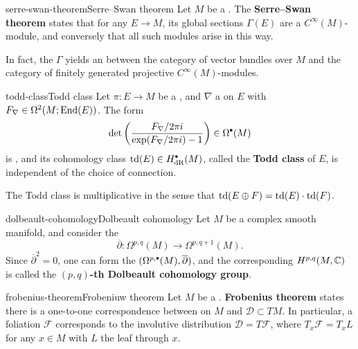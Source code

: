 \begin{topic}{serre-swan-theorem}{Serre--Swan theorem}
    Let $M$ be a  . The \textbf{Serre--Swan theorem} states that for any  $E \to M$, its global sections $\Gamma(E)$ are a   $C^\infty(M)$-module, and conversely that all such modules arise in this way.
    
    In fact, the  $\Gamma$ yields an  between the category of vector bundles over $M$ and the category of finitely generated projective $C^\infty(M)$-modules.
\end{topic}

\begin{topic}{todd-class}{Todd class}
    Let $\pi : E \to M$ be a , and $\nabla$ a  on $E$ with  $F_\nabla \in \Omega^2(M; \textup{End}(E))$. The form
    \[ \det\left(\frac{F_\nabla / 2 \pi i}{\exp(F_\nabla / 2 \pi i) - 1}\right) \in \Omega^\bdot(M) \]
    is , and its cohomology class $\textup{td}(E) \in H^\bdot_\textup{dR}(M)$, called the \textbf{Todd class} of $E$, is independent of the choice of connection.
    
    The Todd class is multiplicative in the sense that $\textup{td}(E \oplus F) = \textup{td}(E) \cdot \textup{td}(F)$.
\end{topic}

\begin{topic}{dolbeault-cohomology}{Dolbeault cohomology}
    Let $M$ be a complex smooth manifold, and consider the 
    \[ \overline{\partial} : \Omega^{p, q}(M) \to \Omega^{p, q + 1}(M) . \]
    Since $\overline{\partial}^2 = 0$, one can form the  $(\Omega^{p, \bdot}(M), \overline{\partial})$, and the corresponding  $H^{p, q}(M, \mathbb{C})$ is called the \textbf{$(p, q)$-th Dolbeault cohomology group}.
\end{topic}

\begin{topic}{frobenius-theorem}{Frobeniuw theorem}
    Let $M$ be a . \textbf{Frobenius theorem} states there is a one-to-one correspondence between  on $M$ and  $\mathcal{D} \subset TM$. In particular, a foliation $\mathcal{F}$ corresponds to the involutive distribution $\mathcal{D} = T \mathcal{F}$, where $T_x \mathcal{F} = T_x L$ for any $x \in M$ with $L$ the leaf through $x$.
\end{topic}

